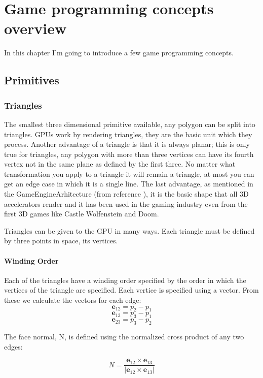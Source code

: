 \chapter{Game programming concepts overview}
\label{chapter:Chapter 3}

In this chapter I’m going to introduce a few game programming concepts.

\section{Primitives}

\subsection{Triangles}

The smallest three dimensional primitive available, any polygon can be split into triangles. GPUs work by rendering triangles, they are the basic unit which they process. Another advantage of a triangle is that it is always planar; this is only true for triangles, any polygon with more than three vertices can have its fourth vertex not in the same plane as defined by the first three. No matter what transformation you apply to a triangle it will remain a triangle, at most you can get an edge case in which it is a single line.
The last advantage, as mentioned in the GameEngineArhitecture (from reference \cite{gregory09}), it is the basic shape that all 3D accelerators render and it has been used in the gaming industry even from the first 3D games like Castle Wolfenstein and Doom.

Triangles can be given to the GPU in many ways. Each triangle must be defined by three points in space, its vertices.

\subsubsection{Winding Order}

Each of the triangles have a winding order specified by the order in which the vertices of the triangle are specified. Each vertice is specified using a vector. From these we calculate the vectors for each edge:
\[ \mathbf{e}_{12} = p_{2} - p_{1}\]
\[ \mathbf{e}_{13} = p_{3} - p_{1}\]
\[\mathbf{e}_{23} = p_{3} - p_{2}\]

The face normal, N, is defined using the normalized cross product of any two edges:

\[ N = \frac{\mathbf{e}_{12}\times \mathbf{e}_{13}}{\left | \mathbf{e}_{12}\times \mathbf{e}_{13}  \right |}\]

